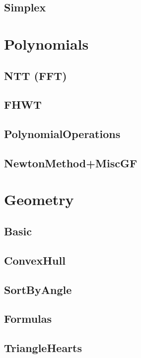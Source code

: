 	\subsection{Simplex}
	
	
\section{Polynomials}
	\subsection{NTT (FFT)}
	
	
	\subsection{FHWT}
	
	\subsection{PolynomialOperations}
	
	\subsection{NewtonMethod+MiscGF}
	
\section{Geometry}
	\subsection{Basic}
	
	\subsection{ConvexHull}
	
	\subsection{SortByAngle}
	
	\subsection{Formulas}
	
	\subsection{TriangleHearts}
	
